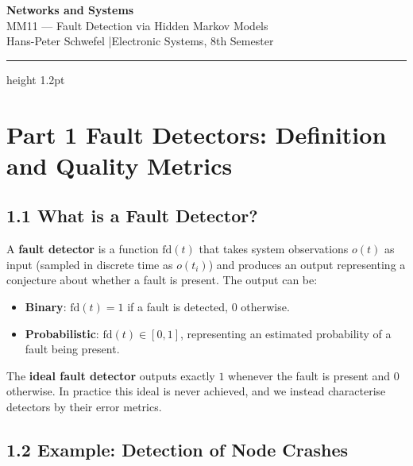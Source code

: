 \documentclass[12pt, a4paper]{article}
\begin{document}
\begin{center}
  {\LARGE\bfseries\color{headernavy} Networks and Systems}\\[4pt]
  {\large MM11 --- Fault Detection via Hidden Markov Models}\\[2pt]
  {\normalsize Hans-Peter Schwefel \quad|\quad Electronic Systems, 8th Semester}
\end{center}

\vspace{4pt}\hrule height 1.2pt\vspace{12pt}

\section*{Part 1 \quad Fault Detectors: Definition and Quality Metrics}

\subsection*{1.1 \quad What is a Fault Detector?}

A \textbf{fault detector} is a function $\mathrm{fd}(t)$ that takes system
observations $o(t)$ as input (sampled in discrete time as $o(t_i)$) and
produces an output representing a conjecture about whether a fault is present.
The output can be:

\begin{itemize}[leftmargin=1.4em, itemsep=3pt]
  \item \textbf{Binary}: $\mathrm{fd}(t) = 1$ if a fault is detected, $0$ otherwise.
  \item \textbf{Probabilistic}: $\mathrm{fd}(t) \in [0, 1]$, representing an estimated
    probability of a fault being present.
\end{itemize}

The \textbf{ideal fault detector} outputs exactly $1$ whenever the fault is
present and $0$ otherwise. In practice this ideal is never achieved, and we
instead characterise detectors by their error metrics.

\subsection*{1.2 \quad Example: Detection of Node Crashes}
\end{document}
